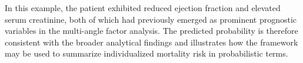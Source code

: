 \begin{table}[H]
\centering
\caption{Example of individual mortality probability prediction for a new patient.}
\label{tab:new_patient_prediction}
\end{table}

In this example, the patient exhibited reduced ejection fraction and elevated serum creatinine, both of which had previously emerged as prominent prognostic variables in the multi-angle factor analysis. The predicted probability is therefore consistent with the broader analytical findings and illustrates how the framework may be used to summarize individualized mortality risk in probabilistic terms.

